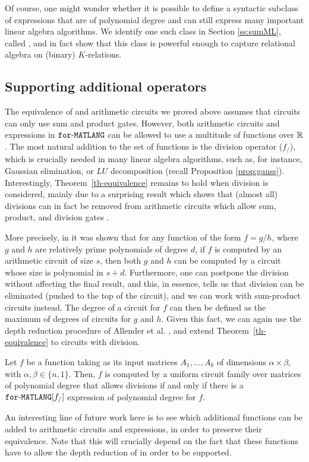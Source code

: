 Of course, one might wonder whether it is possible to define a syntactic subclass of \langfor expressions that are of polynomial degree and can still express many important linear algebra algorithms. We identify one such class in Section \ref{ss:sumML}, called \langsum, and in fact show that this class is powerful enough to capture relational algebra on (binary) $K$-relations. 


\subsection{Supporting additional operators}\label{subsec:additionalop}
The equivalence of \langfor and arithmetic circuits we proved above assumes that circuits can only use sum and product gates. 
However, both arithmetic circuits and expressions in $\texttt{for}\text{-}\texttt{MATLANG}$ can be allowed to use a multitude of functions over $\mathbb{R}$. The most natural addition to the set of functions is the division operator ($f_/$), which is crucially needed in many linear algebra algorithms, such as, for instance, Gaussian elimination, or $LU$ decomposition (recall Proposition \ref{prop:gauss}).
Interestingly, Theorem~\ref{th-equivalence} remains to hold when division is considered, mainly due to a surprising result which shows that (almost all) divisions can in fact be removed from arithmetic circuits which allow sum, product, and division gates \cite{allender}.

More precisely, in \cite{strassen1973vermeidung,borodin1982fast,kaltofen1988greatest} it was shown that for any function of the form $f = g/h$, where $g$ and $h$ are relatively prime polynomials of degree $d$, if $f$ is computed by an arithmetic circuit of size $s$, then both $g$ and $h$ can be computed by a circuit whose size is polynomial in $s + d$. Furthermore, one can postpone the division without affecting the final result, and this, in essence, tells us that division can be eliminated (pushed to the top of the circuit), and we can work with sum-product circuits instead. The degree of a circuit for $f$ can then be defined as the maximum of degrees of circuits for $g$ and $h$. Given this fact, we can again use the depth reduction procedure of Allender et al. \cite{AllenderJMV98}, and extend Theorem~\ref{th-equivalence} to circuits with division.
\begin{corollary}
\label{cor-division}
Let $f$ be a function taking as its input matrices $A_1,\ldots ,A_k$ of dimensions $\alpha\times \beta$, with $\alpha,\beta \in \{n,1\}$. Then, $f$ is computed by a uniform circuit family over matrices of polynomial degree that allows divisions if and only if there is a $\texttt{for}\text{-}\texttt{MATLANG}[f_/]$ expression of polynomial degree for $f$.
\end{corollary}

An interesting line of future work here is to see which additional functions can be added to arithmetic circuits and \langfor expressions, in order to preserve their equivalence. Note that this will crucially depend on the fact that these functions have to allow the depth reduction of \cite{AllenderJMV98} in order to be supported.
